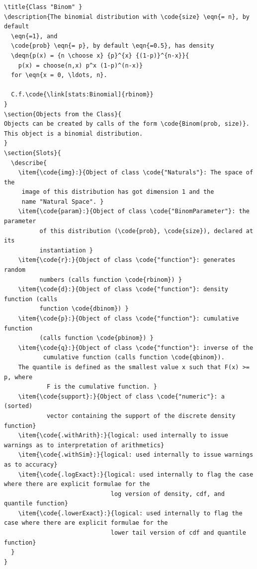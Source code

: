 \documentclass[10pt]{article}
\let\code\lstinline
\begin{document}
\begin{enumerate}
\begin{itemize}
\begin{lstlisting}[style=Rdstyle]
\title{Class "Binom" }
\description{The binomial distribution with \code{size} \eqn{= n}, by default 
  \eqn{=1}, and
  \code{prob} \eqn{= p}, by default \eqn{=0.5}, has density
  \deqn{p(x) = {n \choose x} {p}^{x} {(1-p)}^{n-x}}{
    p(x) = choose(n,x) p^x (1-p)^(n-x)}
  for \eqn{x = 0, \ldots, n}.

  C.f.\code{\link[stats:Binomial]{rbinom}}
}
\section{Objects from the Class}{
Objects can be created by calls of the form \code{Binom(prob, size)}.
This object is a binomial distribution. 
}
\section{Slots}{
  \describe{
    \item{\code{img}:}{Object of class \code{"Naturals"}: The space of the 
     image of this distribution has got dimension 1 and the 
     name "Natural Space". }
    \item{\code{param}:}{Object of class \code{"BinomParameter"}: the parameter 
          of this distribution (\code{prob}, \code{size}), declared at its 
          instantiation }
    \item{\code{r}:}{Object of class \code{"function"}: generates random 
          numbers (calls function \code{rbinom}) }
    \item{\code{d}:}{Object of class \code{"function"}: density function (calls 
          function \code{dbinom}) }
    \item{\code{p}:}{Object of class \code{"function"}: cumulative function 
          (calls function \code{pbinom}) }
    \item{\code{q}:}{Object of class \code{"function"}: inverse of the 
           cumulative function (calls function \code{qbinom}).
    The quantile is defined as the smallest value x such that F(x) >= p, where 
            F is the cumulative function. }
    \item{\code{support}:}{Object of class \code{"numeric"}: a (sorted) 
            vector containing the support of the discrete density function}
    \item{\code{.withArith}:}{logical: used internally to issue warnings as to interpretation of arithmetics}
    \item{\code{.withSim}:}{logical: used internally to issue warnings as to accuracy}
    \item{\code{.logExact}:}{logical: used internally to flag the case where there are explicit formulae for the
                              log version of density, cdf, and quantile function}
    \item{\code{.lowerExact}:}{logical: used internally to flag the case where there are explicit formulae for the
                              lower tail version of cdf and quantile function}
  }
}

\end{lstlisting}
\end{itemize}
\end{enumerate}
\end{document}
